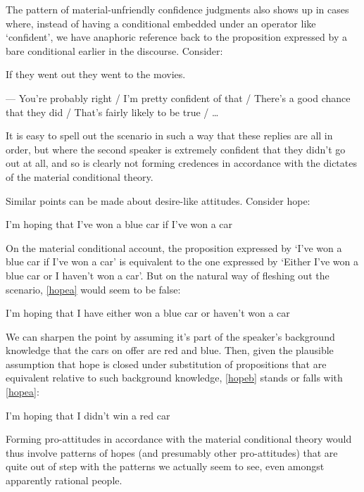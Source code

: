 \documentclass[If.tex]{subfiles}
\begin{document}
The pattern of material-unfriendly confidence judgments also shows up in cases where, instead of having a conditional embedded under an operator like ‘confident’, we have anaphoric reference back to the proposition expressed by a bare conditional earlier in the discourse.  Consider:
\begin{prop}
	\nitem
	If they went out they went to the movies.  
	
	--- You're probably right / I'm pretty confident of that / There's a good chance that they did / That's fairly likely to be true / … %
\end{prop}
It is easy to spell out the scenario in such a way that these replies are all in order, but where the second speaker is extremely confident that they didn't go out at all, and so is clearly not forming credences in accordance with the dictates of the material conditional theory.  

Similar points can be made about desire-like attitudes.  Consider hope:
\begin{prop}
	\nitem \label{hopeblue}
	I'm hoping that I've won a blue car if I've won a car
\end{prop}
On the material conditional account, the proposition expressed by ‘I've won a blue car if I've won a car’ is equivalent to the one expressed by ‘Either I've won a blue car or I haven't won a car’.  But on the natural way of fleshing out the scenario, \ref{hopea} would seem to be false:
\begin{prop}
	\nitem \label{hopea}
	I'm hoping that I have either won a blue car or haven't won a car	
\end{prop}
We can sharpen the point by assuming it's part of the speaker's background knowledge that the cars on offer are red and blue.  Then, given the plausible assumption that hope is closed under substitution of propositions that are equivalent relative to such background knowledge, \ref{hopeb} stands or falls with \ref{hopea}:
\begin{prop}
	\nitem \label{hopeb}
	I'm hoping that I didn't win a red car
\end{prop}
Forming pro-attitudes in accordance with the material conditional theory would thus involve patterns of hopes (and presumably other pro-attitudes) that are quite out of step with the patterns we actually seem to see, even amongst apparently rational people.  
\end{document}
